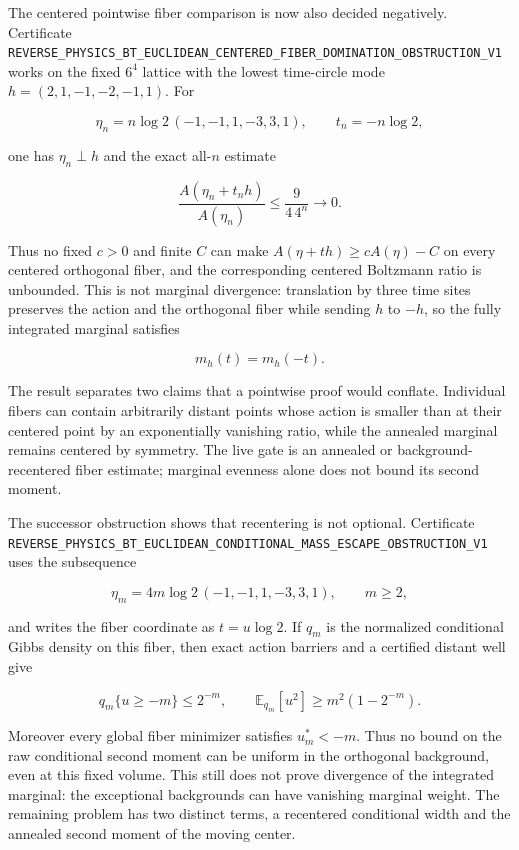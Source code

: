 \documentclass[11pt]{article}
\theoremstyle{definition}
\theoremstyle{remark}
\newcommand{\cert}[1]{\nolinkurl{#1}}
\begin{document}
The centered pointwise fiber comparison is now also decided negatively.
Certificate
\cert{REVERSE_PHYSICS_BT_EUCLIDEAN_CENTERED_FIBER_DOMINATION_OBSTRUCTION_V1}
works on the fixed $6^4$ lattice with the lowest time-circle mode
$h=(2,1,-1,-2,-1,1)$.  For

\[
 \eta_n=n\log2\,(-1,-1,1,-3,3,1),
 \qquad t_n=-n\log2,
\]

one has $\eta_n\perp h$ and the exact all-$n$ estimate

\[
 \frac{A(\eta_n+t_nh)}{A(\eta_n)}
 \leq\frac{9}{4\,4^n}\longrightarrow0.
\]

Thus no fixed $c>0$ and finite $C$ can make
$A(\eta+t h)\geq cA(\eta)-C$ on every centered orthogonal fiber, and the
corresponding centered Boltzmann ratio is unbounded.  This is not marginal
divergence: translation by three time sites preserves the action and the
orthogonal fiber while sending $h$ to $-h$, so the fully integrated
marginal satisfies

\[
                         m_h(t)=m_h(-t).
\]

The result separates two claims that a pointwise proof would conflate.
Individual fibers can contain arbitrarily distant points whose action is
smaller than at their centered point by an exponentially vanishing ratio,
while the annealed marginal remains centered by symmetry.  The live gate is
an annealed or background-recentered fiber estimate; marginal evenness alone
does not bound its second moment.

The successor obstruction shows that recentering is not optional.  Certificate
\cert{REVERSE_PHYSICS_BT_EUCLIDEAN_CONDITIONAL_MASS_ESCAPE_OBSTRUCTION_V1}
uses the subsequence

\[
 \eta_m=4m\log2\,(-1,-1,1,-3,3,1),\qquad m\geq2,
\]

and writes the fiber coordinate as $t=u\log2$.  If $q_m$ is the normalized
conditional Gibbs density on this fiber, then exact action barriers and a
certified distant well give

\[
 q_m\{u\geq-m\}\leq2^{-m},\qquad
 \mathbb E_{q_m}[u^2]\geq m^2(1-2^{-m}).
\]

Moreover every global fiber minimizer satisfies $u_m^*<-m$.  Thus no bound
on the raw conditional second moment can be uniform in the orthogonal
background, even at this fixed volume.  This still does not prove divergence
of the integrated marginal: the exceptional backgrounds can have vanishing
marginal weight.  The remaining problem has two distinct terms, a recentered
conditional width and the annealed second moment of the moving center.
\end{document}
